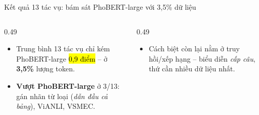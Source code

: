 \begin{frame}{Kết quả 13 tác vụ: bám sát PhoBERT-large với 3,5\% dữ liệu}
\vspace{0.4em}
\begin{columns}[T]
\begin{column}{0.49\textwidth}
  \footnotesize
  \begin{itemize}\itemsep0pt
    \item Trung bình 13 tác vụ chỉ kém PhoBERT-large \hl{0,9 điểm} -- ở
          \textbf{3,5\%} lượng token.
    \item \textbf{Vượt PhoBERT-large} ở 3/13: gán nhãn từ loại
          (\emph{dẫn đầu cả bảng}), ViANLI, VSMEC.
  \end{itemize}
\end{column}
\begin{column}{0.49\textwidth}
  \footnotesize
  \begin{itemize}\itemsep0pt
    \item Cách biệt còn lại nằm ở truy hồi/xếp hạng -- biểu diễn
          \emph{cấp câu}, thứ cần nhiều dữ liệu nhất.
  \end{itemize}
\end{column}
\end{columns}
\end{frame}

